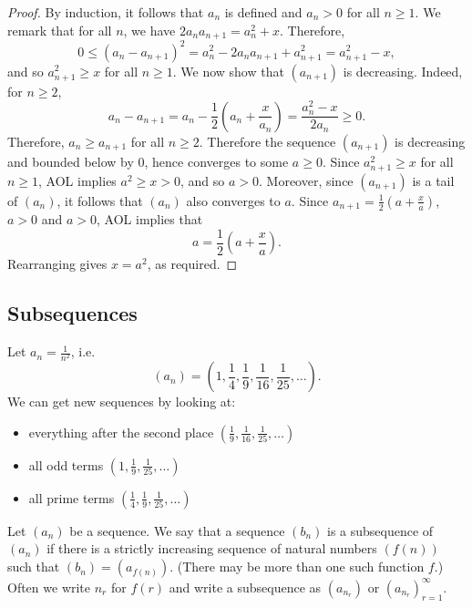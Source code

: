 \documentclass[11pt]{article}
\begin{document}
\begin{proof}
	By induction, it follows that $a_n$ is defined and $a_n > 0$ for all $n \geq 1$. We remark that for all $n$, we have $2a_n a_{n+1} = a_n^2 + x$. Therefore,
	\[
		0 \leq (a_n - a_{n+1})^2 = a_n^2 - 2a_n a_{n+1} + a_{n+1}^2 = a_{n+1}^2 - x,
	\]
	and so $a_{n+1}^2 \geq x$ for all $n \geq 1$. We now show that $(a_{n+1})$ is
	decreasing. Indeed, for $n \geq 2$,
	\[
		a_n - a_{n+1} = a_n - \frac{1}{2} \left( a_n + \frac{x}{a_n} \right) = \frac{a_n^2 - x}{2a_n} \geq 0.
	\]
	Therefore, $a_n \geq a_{n+1}$ for all $n \geq 2$. Therefore the sequence
	$(a_{n+1})$ is decreasing and bounded below by $0$, hence converges to some $a
		\geq 0$. Since $a_{n+1}^2 \geq x$ for all $n \geq 1$, AOL implies $a^2 \geq x >
		0$, and so $a > 0$. Moreover, since $(a_{n+1})$ is a tail of $(a_n)$, it
	follows that $(a_n)$ also converges to $a$. Since $a_{n+1} = \frac{1}{2} \left(
		a + \frac{x}{a} \right)$, $a > 0$ and $a > 0$, AOL implies that
	\[
		a = \frac{1}{2} \left( a + \frac{x}{a} \right).
	\]
	Rearranging gives $x = a^2$, as required.
\end{proof}

\subsection{Subsequences}

\begin{example}\label{2.4.1}
	Let $a_n = \frac{1}{n^2}$, i.e.
	\[
		(a_n) = \left( 1, \frac{1}{4}, \frac{1}{9}, \frac{1}{16}, \frac{1}{25}, \ldots \right).
	\]
	We can get new sequences by looking at:
	\begin{itemize}
		\item everything after the second place $\left( \frac{1}{9}, \frac{1}{16},
			      \frac{1}{25}, \ldots \right)$
		\item all odd terms $\left( 1, \frac{1}{9}, \frac{1}{25}, \ldots \right)$
		\item all prime terms $\left( \frac{1}{4}, \frac{1}{9}, \frac{1}{25}, \ldots \right)$
	\end{itemize}
\end{example}

\begin{definition}\label{2.4.2}
	Let $(a_n)$ be a sequence. We say that a sequence $(b_n)$ is a subsequence of $(a_n)$ if there is a strictly increasing sequence of natural numbers $(f(n))$ such that $(b_n) = (a_{f(n)})$. (There may be more than one such function $f$.) Often we write $n_r$ for $f(r)$ and write a subsequence as $(a_{n_r})$ or $(a_{n_r})_{r=1}^\infty$.
\end{definition}
\end{document}
